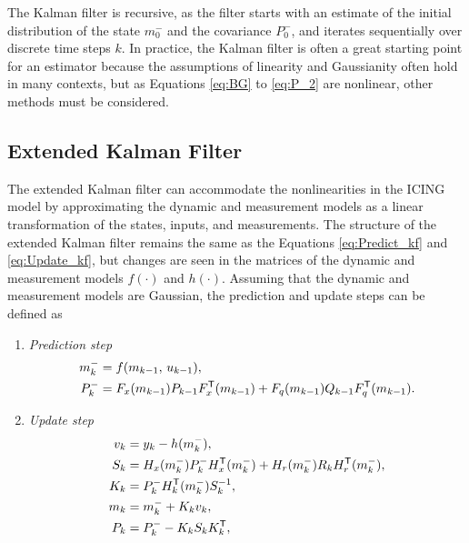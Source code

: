 \documentclass[nomenclature, english, bibtex]{kththesis}
\begin{document}
The Kalman filter is recursive, as the filter starts with an estimate of the initial distribution of the state $m_0^-$ and the covariance $P_0^-$, and iterates sequentially over discrete time steps $k$. In practice, the Kalman filter is often a great starting point for an estimator because the assumptions of linearity and Gaussianity often hold in many contexts, but as Equations \eqref{eq:BG} to \eqref{eq:P_2} are nonlinear, other methods must be considered.

\subsection{Extended Kalman Filter}

The extended Kalman filter can accommodate the nonlinearities in the \gls{ICING} model by approximating the dynamic and measurement models as a linear transformation of the states, inputs, and measurements. The structure of the extended Kalman filter remains the same as the Equations \eqref{eq:Predict_kf} and \eqref{eq:Update_kf}, but changes are seen in the matrices of the dynamic and measurement models $f(\cdot)$ and $h(\cdot)$. Assuming that the dynamic and measurement models are Gaussian, the prediction and update steps \cite{sarkka_bayesian_nodate} can be defined as
\begin{enumerate}
    \item \textit{Prediction step} 
    \begin{equation} \label{eq:Predict}
        \begin{aligned}
            m_{k}^- &= f(m_{k-1},\,u_{k-1}), \\
            P_{k}^- &= F_x(m_{k-1})P_{k-1}F_x^{\sf T}(m_{k-1}) + F_q(m_{k-1})Q_{k-1}F_q^{\sf T}(m_{k-1}).
        \end{aligned}
    \end{equation}
    \item \textit{Update step} 
    \begin{equation} \label{eq:Update}
        \begin{aligned}
            v_{k} &= y_{k} - h(m_k^-), \\
            S_{k} &= H_x(m_k^-)P_{k}^-H_x^{\sf T}(m_k^-) + H_r(m_k^-)R_kH_r^{\sf T}(m_k^-), \\
            K_k &= P_k^-H_k^{\sf T}(m_k^-)S_k^{-1}, \\
            m_k &= m_k^- + K_kv_k, \\
            P_k &= P_k^- - K_kS_kK_k^{\sf T},
        \end{aligned}
    \end{equation}
\end{enumerate} 
\end{document}
